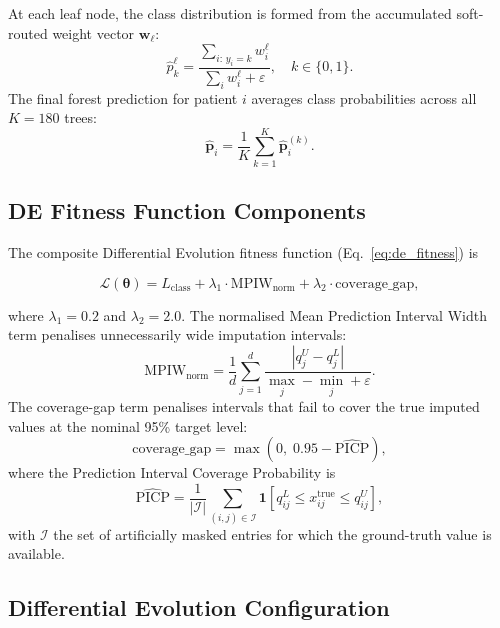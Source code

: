 \documentclass[journal]{IEEEtran}
\begin{document}
	At each leaf node, the class distribution is formed from the accumulated soft-routed weight vector $\mathbf{w}_\ell$:
	\begin{equation}
		\hat{p}^{\ell}_k
		= \frac{\sum_{i:\, y_i = k} w^\ell_i}
		{\sum_i w^\ell_i + \varepsilon},
		\quad k \in \{0, 1\}.
		\label{eq:leaf_dist}
	\end{equation}
	The final forest prediction for patient $i$ averages class probabilities across all $K=180$ trees:
	\begin{equation}
		\hat{\mathbf{p}}_i =
		\frac{1}{K} \sum_{k=1}^{K} \hat{\mathbf{p}}^{(k)}_i.
		\label{eq:forest_avg}
	\end{equation}
	
	\subsection{DE Fitness Function Components}
	
	The composite Differential Evolution fitness function (Eq.~\ref{eq:de_fitness}) is
	
		\[
	\mathcal{L}(\boldsymbol{\theta}) =
	L_{\text{class}}
	+ \lambda_1 \cdot \text{MPIW}_{\text{norm}}
	+ \lambda_2 \cdot \text{coverage\_gap},
	\]
	
	where $\lambda_1=0.2$ and $\lambda_2=2.0$.
	The normalised Mean Prediction Interval Width term penalises unnecessarily wide imputation intervals:
	\begin{equation}
		\text{MPIW}_{\text{norm}} =
		\frac{1}{d} \sum_{j=1}^{d}
		\frac{|q^U_j - q^L_j|}
		{\max_j - \min_j + \varepsilon}.
		\label{eq:mpiw}
	\end{equation}
	The coverage-gap term penalises intervals that fail to cover the true imputed values at the nominal 95\% target level:
	\begin{equation}
		\text{coverage\_gap} =
		\max\!\left(0,\; 0.95 - \widehat{\text{PICP}}\right),
		\label{eq:coverage_gap}
	\end{equation}
	where the Prediction Interval Coverage Probability is
	\begin{equation}
		\widehat{\text{PICP}} =
		\frac{1}{|\mathcal{I}|}
		\sum_{(i,j) \in \mathcal{I}}
		\mathbf{1}\!\left[q^L_{ij} \le x^{\text{true}}_{ij}
		\le q^U_{ij}\right],
		\label{eq:picp}
	\end{equation}
	with $\mathcal{I}$ the set of artificially masked entries for which the ground-truth value is available.
	
	\subsection{Differential Evolution Configuration}
	
\end{document}
